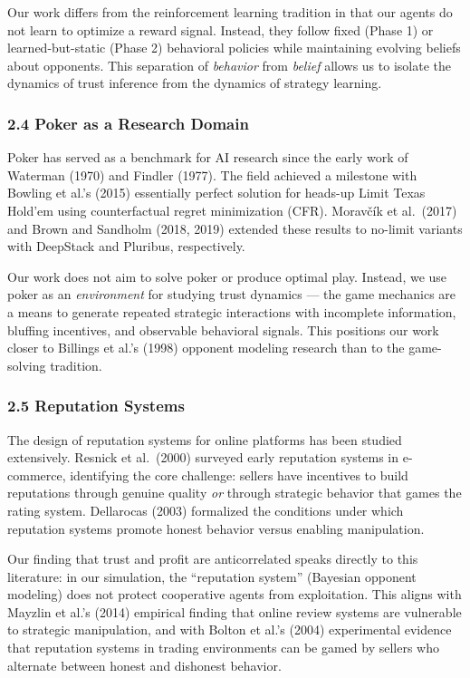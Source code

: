 \documentclass[
]{article}
\begin{document}
Our work differs from the reinforcement learning tradition in that our
agents do not learn to optimize a reward signal. Instead, they follow
fixed (Phase 1) or learned-but-static (Phase 2) behavioral policies
while maintaining evolving beliefs about opponents. This separation of
\emph{behavior} from \emph{belief} allows us to isolate the dynamics of
trust inference from the dynamics of strategy learning.

\hypertarget{poker-as-a-research-domain}{%
\subsubsection{2.4 Poker as a Research
Domain}\label{poker-as-a-research-domain}}

Poker has served as a benchmark for AI research since the early work of
Waterman (1970) and Findler (1977). The field achieved a milestone with
Bowling et al.'s (2015) essentially perfect solution for heads-up Limit
Texas Hold'em using counterfactual regret minimization (CFR). Moravčík
et al.~(2017) and Brown and Sandholm (2018, 2019) extended these results
to no-limit variants with DeepStack and Pluribus, respectively.

Our work does not aim to solve poker or produce optimal play. Instead,
we use poker as an \emph{environment} for studying trust dynamics ---
the game mechanics are a means to generate repeated strategic
interactions with incomplete information, bluffing incentives, and
observable behavioral signals. This positions our work closer to
Billings et al.'s (1998) opponent modeling research than to the
game-solving tradition.

\hypertarget{reputation-systems}{%
\subsubsection{2.5 Reputation Systems}\label{reputation-systems}}

The design of reputation systems for online platforms has been studied
extensively. Resnick et al.~(2000) surveyed early reputation systems in
e-commerce, identifying the core challenge: sellers have incentives to
build reputations through genuine quality \emph{or} through strategic
behavior that games the rating system. Dellarocas (2003) formalized the
conditions under which reputation systems promote honest behavior versus
enabling manipulation.

Our finding that trust and profit are anticorrelated speaks directly to
this literature: in our simulation, the ``reputation system'' (Bayesian
opponent modeling) does not protect cooperative agents from
exploitation. This aligns with Mayzlin et al.'s (2014) empirical finding
that online review systems are vulnerable to strategic manipulation, and
with Bolton et al.'s (2004) experimental evidence that reputation
systems in trading environments can be gamed by sellers who alternate
between honest and dishonest behavior.
\end{document}
